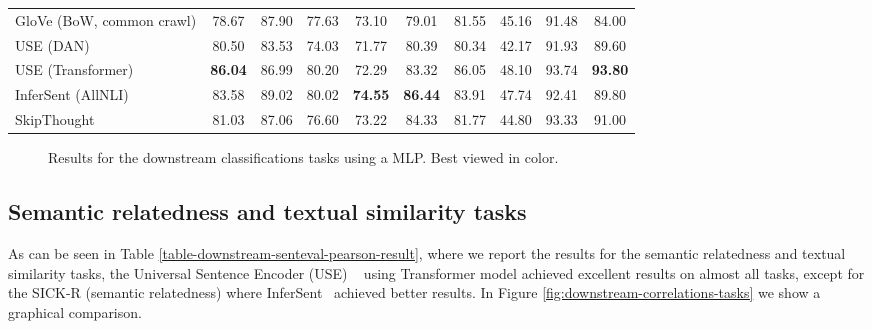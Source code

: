 \documentclass{article}
\begin{document}
\begin{table}[!htb]
{\begin{tabular}{lccccccccc}
GloVe (BoW, common crawl)                & 78.67 & 87.90 & 77.63 & 73.10 & 79.01  & 81.55 & 45.16 & 91.48 & 84.00 \\
USE (DAN)         & 80.50 & 83.53 & 74.03 & 71.77 & 80.39  & 80.34 & 42.17 & 91.93 & 89.60 \\
USE (Transformer)    & \textbf{86.04} & 86.99 & 80.20 & 72.29 & 83.32  & 86.05 & 48.10 & 93.74 & \textbf{93.80} \\
InferSent (AllNLI)            & 83.58 & 89.02 & 80.02 & \textbf{74.55} & \textbf{86.44}  & 83.91 & 47.74 & 92.41 & 89.80 \\
SkipThought          & 81.03 & 87.06 & 76.60 & 73.22 & 84.33  & 81.77 & 44.80 & 93.33 & 91.00 \\
\bottomrule
\end{tabular}}
\end{table}


\begin{figure}[!htb]
\caption{Results for the downstream classifications tasks using a MLP. Best viewed in color.}
\label{fig:downstream-classification-tasks}
\end{figure}





\subsection{Semantic relatedness and textual similarity tasks}
As can be seen in Table \ref{table-downstream-senteval-pearson-result}, where we report the results for the semantic relatedness and textual similarity tasks, the Universal Sentence Encoder (USE) ~\cite{DBLP:journals/corr/abs-1803-11175} using Transformer model achieved excellent results on almost all tasks, except for the SICK-R (semantic relatedness) where InferSent~\cite{conneau2017supervised} achieved better results.
In Figure \ref{fig:downstream-correlations-tasks} we show a graphical comparison.
\end{document}
